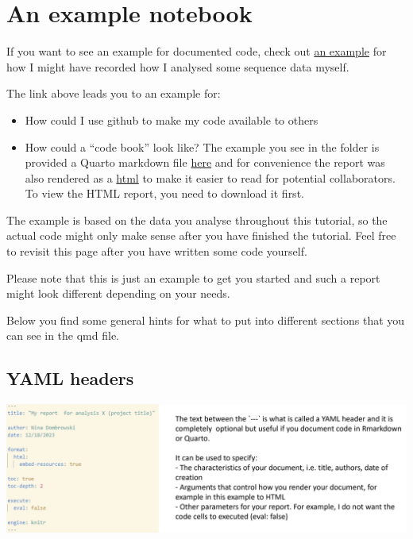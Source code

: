 \documentclass[
  letterpaper,
  DIV=11,
  numbers=noendperiod]{scrreprt}
\author{}
\date{}
\providecommand{\tightlist}{%
  \setlength{\itemsep}{0pt}\setlength{\parskip}{0pt}}\usepackage{longtable,booktabs,array}
\renewcommand*\contentsname{Table of contents}
\newcommand\contentsname{Table of contents}
\begin{document}

\renewcommand*\contentsname{Table of contents}
{
\hypersetup{linkcolor=}
\setcounter{tocdepth}{1}
\tableofcontents
}
\section{An example notebook}\label{an-example-notebook}

If you want to see an example for documented code, check out
\href{https://github.com/ndombrowski/cli_workshop/tree/main/example_doc}{an
example} for how I might have recorded how I analysed some sequence data
myself.

The link above leads you to an example for:

\begin{itemize}
\tightlist
\item
  How could I use github to make my code available to others
\item
  How could a ``code book'' look like? The example you see in the folder
  is provided a Quarto markdown file
  \href{https://github.com/ndombrowski/cli_workshop/blob/main/example_doc/example_notebook.qmd}{here}
  and for convenience the report was also rendered as a
  \href{https://github.com/ndombrowski/cli_workshop/blob/main/docs/example_doc/example_notebook.html}{html}
  to make it easier to read for potential collaborators. To view the
  HTML report, you need to download it first.
\end{itemize}

The example is based on the data you analyse throughout this tutorial,
so the actual code might only make sense after you have finished the
tutorial. Feel free to revisit this page after you have written some
code yourself.

Please note that this is just an example to get you started and such a
report might look different depending on your needs.

Below you find some general hints for what to put into different
sections that you can see in the qmd file.

\subsection{YAML headers}\label{yaml-headers}

\includegraphics[width=7.84375in,height=\textheight]{../img/yaml_header.png}
\end{document}
